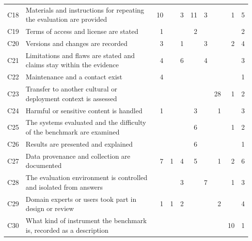 \begin{table}[t]
\begin{tabular}{@{}llrrrrrrrr@{}}
C18 & Materials and instructions for repeating the evaluation are provided & 10 &  & 3 & 11 & 3 &  & 1 & 5 \\
C19 & Terms of access and license are stated & 1 &  &  & 2 &  &  &  & 2 \\
C20 & Versions and changes are recorded & 3 &  & 1 &  & 3 &  & 2 & 4 \\
C21 & Limitations and flaws are stated and claims stay within the evidence & 4 &  & 6 &  & 4 &  &  & 3 \\
C22 & Maintenance and a contact exist & 4 &  &  &  &  &  &  & 1 \\
C23 & Transfer to another cultural or deployment context is assessed &  &  &  &  &  & 28 & 1 & 2 \\
C24 & Harmful or sensitive content is handled & 1 &  &  & 3 &  & 1 &  & 3 \\
C25 & The systems evaluated and the difficulty of the benchmark are examined &  &  &  & 6 &  &  & 1 & 2 \\
C26 & Results are presented and explained &  &  &  & 6 &  &  &  & 1 \\
C27 & Data provenance and collection are documented & 7 & 1 & 4 & 5 &  & 1 & 2 & 6 \\
C28 & The evaluation environment is controlled and isolated from answers &  &  & 3 &  & 7 &  & 1 & 3 \\
C29 & Domain experts or users took part in design or review & 1 & 1 & 2 &  &  & 2 &  & 4 \\
C30 & What kind of instrument the benchmark is, recorded as a description &  &  &  &  &  &  & 10 & 1 \\
\bottomrule
\end{tabular}
\end{table}
